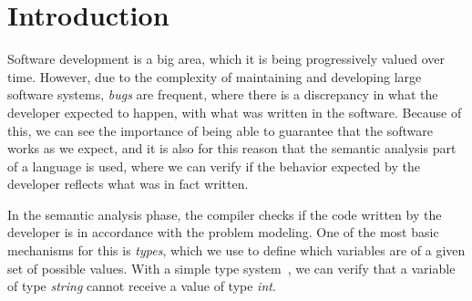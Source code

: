 \chapter{Introduction}

Software development is a big area, which it is being progressively valued over time.
However, due to the complexity of maintaining and developing large software systems, \textit{bugs} are frequent, where there is a discrepancy in what the developer expected to happen, with what was written in the software.
Because of this, we can see the importance of being able to guarantee that the software works as we expect, and it is also for this reason that the semantic analysis part of a language is used, where we can verify if the behavior expected by the developer reflects what was in fact written.

In the semantic analysis phase, the compiler checks if the code written by the developer is in accordance with the problem modeling. One of the most basic mechanisms for this is \emph{types}, which we use to define which variables are of a given set of possible values. With a simple type system~\cite{tapl}, we can verify that a variable of type \emph{string} cannot receive a value of type \emph{int}.

